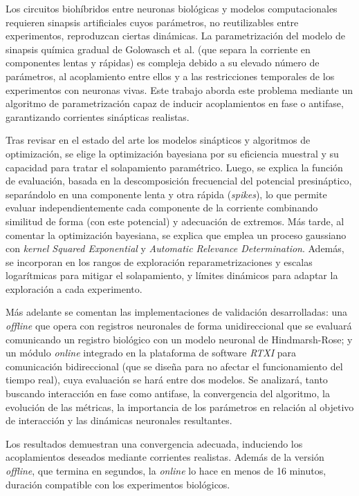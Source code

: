 Los circuitos biohíbridos entre neuronas biológicas y modelos computacionales requieren sinapsis artificiales cuyos parámetros, no reutilizables entre experimentos, reproduzcan ciertas dinámicas. La parametrización del modelo de sinapsis química gradual de Golowasch et al. (que separa la corriente en componentes lentas y rápidas) es compleja debido a su elevado número de parámetros, al acoplamiento entre ellos y a las restricciones temporales de los experimentos con neuronas vivas. Este trabajo aborda este problema mediante un algoritmo de parametrización capaz de inducir acoplamientos en fase o antifase, garantizando corrientes sinápticas realistas.

Tras revisar en el estado del arte los modelos sinápticos y algoritmos de optimización, se elige la optimización bayesiana por su eficiencia muestral y su capacidad para tratar el solapamiento paramétrico. Luego, se explica la función de evaluación, basada en la descomposición frecuencial del potencial presináptico, separándolo en una componente lenta y otra rápida (\textit{spikes}), lo que permite evaluar independientemente cada componente de la corriente combinando similitud de forma (con este potencial) y adecuación de extremos. Más tarde, al comentar la optimización bayesiana, se explica que emplea un proceso gaussiano con \textit{kernel Squared Exponential} y \textit{Automatic Relevance Determination}. Además, se incorporan en los rangos de exploración reparametrizaciones y escalas logarítmicas para mitigar el solapamiento, y límites dinámicos para adaptar la exploración a cada experimento.

Más adelante se comentan las implementaciones de validación desarrolladas: una \textit{offline} que opera con registros neuronales de forma unidireccional que se evaluará comunicando un registro biológico con un modelo neuronal de Hindmarsh-Rose; y un módulo \textit{online} integrado en la plataforma de software \textit{RTXI} para comunicación bidireccional (que se diseña para no afectar el funcionamiento del tiempo real), cuya evaluación se hará entre dos modelos. Se analizará, tanto buscando interacción en fase como antifase, la convergencia del algoritmo, la evolución de las métricas, la importancia de los parámetros en relación al objetivo de interacción y las dinámicas neuronales resultantes.

Los resultados demuestran una convergencia adecuada, induciendo los acoplamientos deseados mediante corrientes realistas. Además de la versión \textit{offline}, que termina en segundos, la \textit{online} lo hace en menos de 16 minutos, duración compatible con los experimentos biológicos.

\vspace*{-1cm}